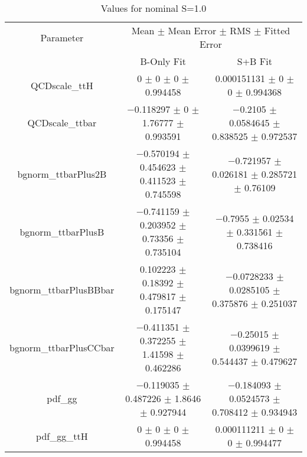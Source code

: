 \begin{table}
\centering
\caption{Values for nominal S=1.0}
\begin{tabular}{ccc}
\toprule
Parameter & \multicolumn{2}{c}{Mean $\pm$ Mean Error $\pm$ RMS $\pm$ Fitted Error}\\
 & B-Only Fit & S+B Fit\\
\midrule
QCDscale\_ttH & \num{0} $\pm$ \num{0} $\pm$ \num{0} $\pm$ \num{0.994458} & \num{0.000151131} $\pm$ \num{0} $\pm$ \num{0} $\pm$ \num{0.994368}\\
QCDscale\_ttbar & \num{-0.118297} $\pm$ \num{0} $\pm$ \num{1.76777} $\pm$ \num{0.993591} & \num{-0.2105} $\pm$ \num{0.0584645} $\pm$ \num{0.838525} $\pm$ \num{0.972537}\\
bgnorm\_ttbarPlus2B & \num{-0.570194} $\pm$ \num{0.454623} $\pm$ \num{0.411523} $\pm$ \num{0.745598} & \num{-0.721957} $\pm$ \num{0.026181} $\pm$ \num{0.285721} $\pm$ \num{0.76109}\\
bgnorm\_ttbarPlusB & \num{-0.741159} $\pm$ \num{0.203952} $\pm$ \num{0.73356} $\pm$ \num{0.735104} & \num{-0.7955} $\pm$ \num{0.02534} $\pm$ \num{0.331561} $\pm$ \num{0.738416}\\
bgnorm\_ttbarPlusBBbar & \num{0.102223} $\pm$ \num{0.18392} $\pm$ \num{0.479817} $\pm$ \num{0.175147} & \num{-0.0728233} $\pm$ \num{0.0285105} $\pm$ \num{0.375876} $\pm$ \num{0.251037}\\
bgnorm\_ttbarPlusCCbar & \num{-0.411351} $\pm$ \num{0.372255} $\pm$ \num{1.41598} $\pm$ \num{0.462286} & \num{-0.25015} $\pm$ \num{0.0399619} $\pm$ \num{0.544437} $\pm$ \num{0.479627}\\
pdf\_gg & \num{-0.119035} $\pm$ \num{0.487226} $\pm$ \num{1.8646} $\pm$ \num{0.927944} & \num{-0.184093} $\pm$ \num{0.0524573} $\pm$ \num{0.708412} $\pm$ \num{0.934943}\\
pdf\_gg\_ttH & \num{0} $\pm$ \num{0} $\pm$ \num{0} $\pm$ \num{0.994458} & \num{0.000111211} $\pm$ \num{0} $\pm$ \num{0} $\pm$ \num{0.994477}\\
\bottomrule
\end{tabular}
\end{table}